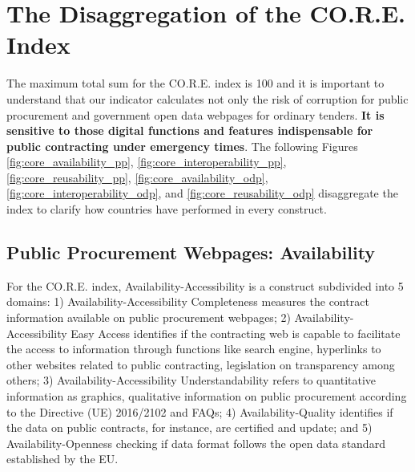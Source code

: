 \documentclass[a4paper, twoside]{report}
\begin{document}
\section{The Disaggregation of the CO.R.E. Index}
\label{section_disaggregation_core}

The maximum total sum for the CO.R.E. index is 100 and it is important to understand that our indicator calculates not only the risk of corruption for public procurement and government open data webpages for ordinary tenders. \textbf{It is sensitive to those digital functions and features indispensable for public contracting under emergency times}. The following Figures \ref{fig:core_availability_pp}, \ref{fig:core_interoperability_pp}, \ref{fig:core_reusability_pp},  \ref{fig:core_availability_odp}, \ref{fig:core_interoperability_odp}, and \ref{fig:core_reusability_odp} disaggregate the index to clarify how countries have performed in every construct.\\

\subsection{Public Procurement Webpages: Availability}

For the CO.R.E. index, Availability-Accessibility is a construct subdivided into 5 domains: 1) Availability-Accessibility Completeness measures the contract information available on public procurement webpages; 2) Availability-Accessibility Easy Access identifies if the contracting web is capable to facilitate the access to information through functions like search engine, hyperlinks to other websites related to public contracting, legislation on transparency among others;  3) Availability-Accessibility Understandability refers to quantitative information as graphics, qualitative information on public procurement according to the Directive (UE) 2016/2102 and FAQs; 4) Availability-Quality identifies if the data on public contracts, for instance, are certified and update; and 5) Availability-Openness checking if data format follows the open data standard established by the EU.\\
\end{document}
